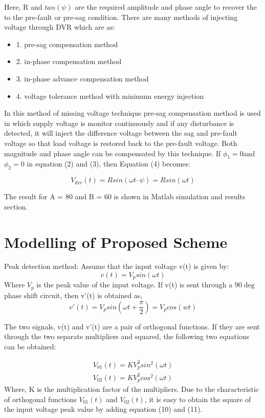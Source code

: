 \documentclass[journal,twoside]{IEEEtran}
\begin{document}
Here, R and $tan(\psi)$ are the required amplitude and phase angle to recover the to the pre-fault or pre-sag condition. There are many methods of injecting voltage through DVR which are as:
\begin{itemize}

\item{1.} pre-sag compensation method
\item{2.} in-phase compensation method
\item{3.} in-phase advance compensation method
\item{4.} voltage tolerance method with minimum energy
injection
\end{itemize}
In this method of missing voltage technique pre-sag compensation method is used in which supply voltage is monitor continuously and if any disturbance is detected, it will inject the difference voltage between the sag and pre-fault voltage so that load voltage is restored back to the pre-fault voltage. Both magnitude and phase angle can be compensated by this technique. 
If $\phi _1 = 0 $and $\phi _2 = 0$ in equation (2) and (3), then
Equation (4) becomes:

\begin{equation}
V_{dvr}(t)= Rsin(\omega t –\psi) = R sin(\omega t )
\end{equation}


The result for A = 80 and B = 60 is shown in Matlab
simulation and results section.
	

\section{Modelling of Proposed Scheme}

Peak detection method:
Assume that the input voltage v(t) is given by:
\begin{equation}
v(t) = V_psin(\omega t)
\end{equation}
Where $V_p$ is the peak value of the input voltage. If v(t) is
sent through a $90 \deg$ phase shift circuit, then v'(t) is
obtained as,
\begin{equation}
v'(t) =V_p sin(\omega t +\frac{\pi}{2} )=V_p cos(wt)
\end{equation}

The two signals, v(t) and v'(t) are a pair of orthogonal
functions. If they are sent through the two separate
multipliers and squared, the following two equations can
be obtained:

\begin{align}
V_{01}(t)=KV_p^2sin^2(\omega t)\\
V_{02}(t)=KV_p^2cos^2(\omega t)
\end{align}
Where, K is the multiplication factor of the multipliers.
Due to the characteristic of orthogonal functions $V_{01}(t)$
and $V_{02}(t)$, it is easy to obtain the square of the input
voltage peak value by adding equation (10) and (11).
\end{document}
